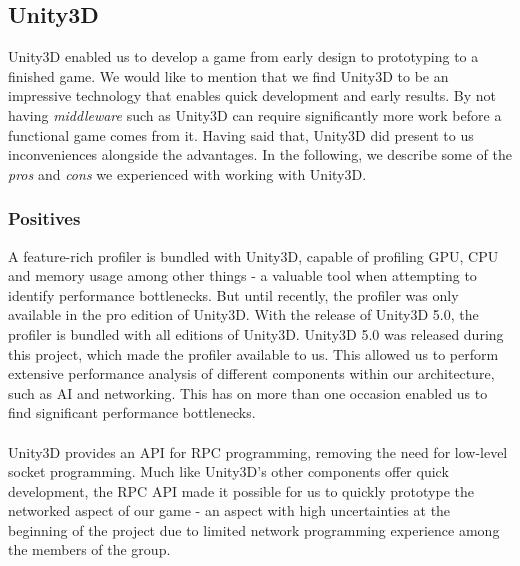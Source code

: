 \subsection{Unity3D}
Unity3D enabled us to develop a game from early design to prototyping to a
finished game. We would like to mention that we find Unity3D to be an
impressive technology that enables quick development and early results. By not
having \textit{middleware} such as Unity3D can require significantly more work
before a functional game comes from it.
Having said that, Unity3D did present to us inconveniences alongside the
advantages. In the following, we describe some of the \textit{pros} and
\textit{cons} we experienced with working with Unity3D.

\subsubsection*{Positives}
A feature-rich profiler is bundled with Unity3D, capable of profiling GPU, CPU
and memory usage among other things - a valuable tool when attempting to
identify performance bottlenecks. But until recently, the profiler was only
available in the pro edition of Unity3D. With the release of Unity3D 5.0, the
profiler is bundled with all editions of Unity3D. Unity3D 5.0 was released
during this project, which made the profiler available to us. This allowed us
to perform extensive performance analysis of different components within our
architecture, such as AI and networking. This has on more than one occasion
enabled us to find significant performance bottlenecks.
\\
\\
Unity3D provides an API for RPC programming, removing the need for low-level
socket programming. Much like Unity3D's other components offer quick
development, the RPC API made it possible for us to quickly prototype the
networked aspect of our game - an aspect with high uncertainties at the
beginning of the project due to limited network programming experience
among the members of the group.

